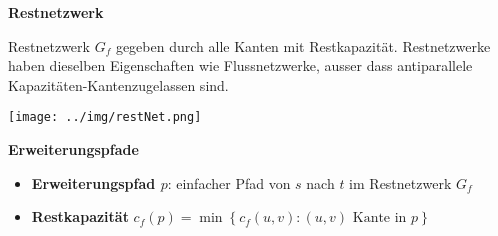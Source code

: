\documentclass[german]{latex4ei/latex4ei_sheet}
\begin{document}
\begin{sectionbox}
\textbf{Restnetzwerk}\par
Restnetzwerk $G_{f}$ gegeben durch alle Kanten mit Restkapazität. Restnetzwerke haben dieselben Eigenschaften wie Flussnetzwerke, ausser dass antiparallele Kapazitäten-Kantenzugelassen sind.\par\smallskip
\begin{center}
    \texttt{[image: ../img/restNet.png]}
\end{center}\par\smallskip

\textbf{Erweiterungspfade}\par
\begin{itemize}
    \item \textbf{Erweiterungspfad $p$}: einfacher Pfad von $s$ nach $t$ im Restnetzwerk $G_{f}$
    \item \textbf{Restkapazität} $c_{f}(p)=\min \left\{c_{f}(u, v):(u, v) \text { Kante in } p\right\}$
\end{itemize}

\end{sectionbox}
\end{document}
